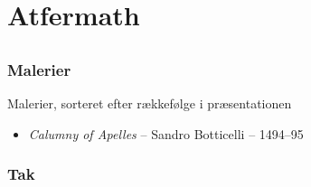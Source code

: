 \documentclass[xcolor=table]{beamer}
\begin{document}
\section{Atfermath}
\subsection*{}
\begin{frame}

    \frametitle{Malerier}

    Malerier, sorteret efter rækkefølge i præsentationen

    \begin{itemize}
        \item \emph{Calumny of Apelles} -- Sandro Botticelli -- 1494--95
    \end{itemize}


\end{frame}

\begin{frame}

    \frametitle{Tak}

\end{frame}
\end{document}
